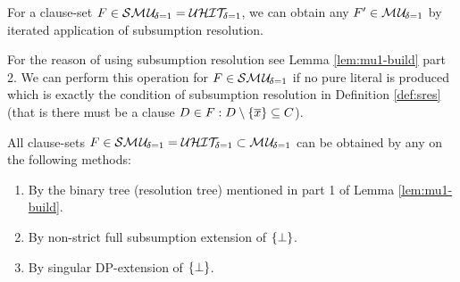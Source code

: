 \documentclass{report}
\begin{document}
\begin{lem}\label{lem:smu1tomu1}
For a clause-set $F \in \mathcal{S}\mathcal{M\hspace{0.8pt}U}_{\!\delta=1}=\mathcal{U}\mathcal{HIT}_{\!\!\delta=1} $, we can obtain any $F' \in  \mathcal{M\hspace{0.8pt}U}_{\!\delta=1}$ by iterated application of subsumption resolution.
\end{lem}
\begin{prf}
For the reason of using subsumption resolution see Lemma \ref{lem:mu1-build} part 2. We can perform this operation for $F \in \mathcal{S}\mathcal{M\hspace{0.8pt}U}_{\!\delta=1}$ if no pure literal is produced which is exactly the condition of subsumption resolution in Definition \ref{def:sres} (that is there must be a clause $D \in F: D \setminus \{ \overline x \} \subseteq C$).
\end{prf}

\begin{lem}\label{lem:smu1-uhit1}
All clause-sets $F \in  \mathcal{S}\mathcal{M\hspace{0.8pt}U}_{\!\delta=1} = \mathcal{U}\mathcal{HIT}_{\!\!\delta=1} \subset \mathcal{M\hspace{0.8pt}U}_{\!\delta=1}$ can be obtained by any on the following methods:
  \begin{enumerate}
  \item By the binary tree (resolution tree) mentioned in part 1 of Lemma \ref{lem:mu1-build}.
  \item By non-strict full subsumption extension of $\{ \bot \}$.
  \item By singular DP-extension of $\{ \bot \}$.
  \end{enumerate} 
\end{lem}
\end{document}
